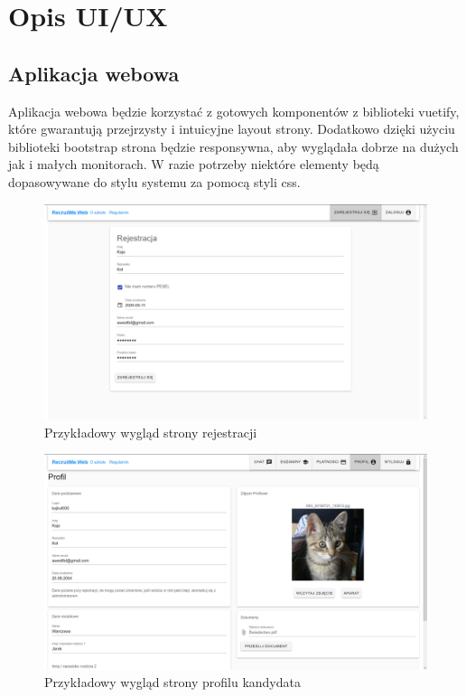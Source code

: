 \documentclass{article}
\begin{document}
\section{Opis UI/UX}
\subsection{Aplikacja webowa}
Aplikacja webowa będzie korzystać z gotowych komponentów z biblioteki vuetify, które gwarantują przejrzysty i intuicyjne layout strony. Dodatkowo dzięki użyciu biblioteki bootstrap strona będzie responsywna, aby wyglądała dobrze na dużych jak i małych monitorach. W razie potrzeby niektóre elementy będą dopasowywane do stylu systemu za pomocą styli css.

\begin{figure}[H]
\centering
\includegraphics[scale=0.18]{images/rejestracjaMockup.png}
\caption{Przykładowy wygląd strony rejestracji}
\end{figure}

\begin{figure}[H]
\centering
\includegraphics[scale=0.18]{images/profilMockup.png}
\caption{Przykładowy wygląd strony profilu kandydata}
\end{figure}
\end{document}
